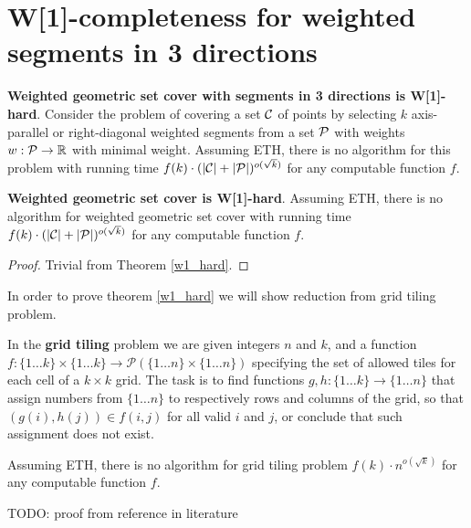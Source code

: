 \section{W[1]-completeness for weighted segments in 3 directions}

\begin{tw}
\label{w1_hard}
	\textbf{Weighted geometric set cover with segments in 3 directions is W[1]-hard}.
	Consider the problem of covering a set $\mathcal{C}$ of points
	by selecting $k$ axis-parallel or right-diagonal weighted segments
	from a set $\mathcal{P}$ 
	with weights $w : \mathcal{P} \rightarrow \mathbb{R}$
	with minimal weight.
	Assuming ETH, there is no algorithm for this
	problem with running time
	$f(k)\cdot(|\mathcal{C}| + |\mathcal{P}|)^{o(\sqrt{k})}$
	for any computable function $f$.
\end{tw}

\begin{corollary}
	\textbf{Weighted geometric set cover is W[1]-hard}.
	Assuming ETH, there is no algorithm for weighted geometric set cover
	with running time
	$f(k)\cdot(|\mathcal{C}| + |\mathcal{P}|)^{o(\sqrt{k})}$
	for any computable function $f$.
\end{corollary}

\begin{proof}
Trivial from Theorem \ref{w1_hard}. 
\end{proof}

In order to prove theorem \ref{w1_hard} we will show reduction from grid tiling problem.

\begin{defi}
In the \textbf{grid tiling} problem we are given integers $n$ and $k$,
and a function $f : \{1 \ldots k\} \times \{1 \ldots k\} \rightarrow \mathcal{P}(\{1 \ldots n\} \times \{1 \ldots n\})$ specifying the set of allowed tiles for each cell of a $k \times k$ grid.
The task is to find functions $g,h : \{1 \ldots k\} \rightarrow \{1 \ldots n\}$ that assign numbers from $\{1 \ldots n\}$ to respectively rows and columns of the grid,
so that $(g(i), h(j)) \in f(i, j)$ for all valid $i$ and $j$, or conclude that such assignment
does not exist.
\end{defi}


\begin{tw}
\label{grid_tiling_w1_hard}
Assuming ETH, there is no algorithm for grid tiling problem
$f(k)\cdot n^{o(\sqrt{k})}$
for any computable function $f$.
\end{tw}

TODO: proof from reference in literature

